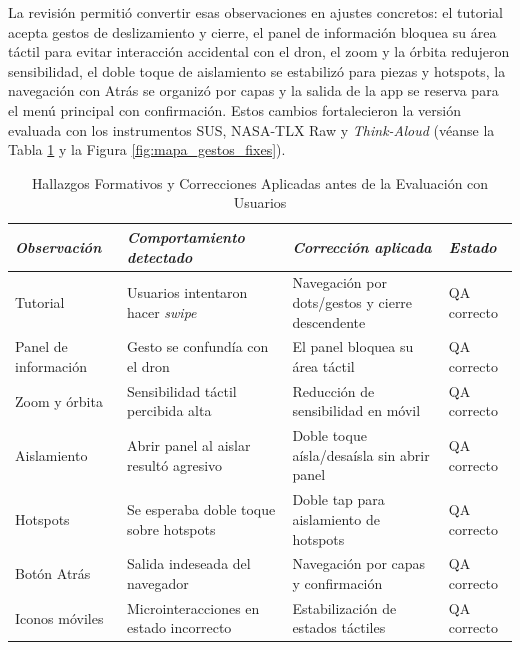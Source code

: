 La revisión permitió convertir esas observaciones en ajustes concretos: el tutorial acepta gestos de deslizamiento y cierre, el panel de información bloquea su área táctil para evitar interacción accidental con el dron, el zoom y la órbita redujeron sensibilidad, el doble toque de aislamiento se estabilizó para piezas y hotspots, la navegación con Atrás se organizó por capas y la salida de la app se reserva para el menú principal con confirmación. Estos cambios fortalecieron la versión evaluada con los instrumentos SUS, NASA-TLX Raw y \textit{Think-Aloud} (véanse la Tabla \ref{tab:hallazgos_formativos_fixes} y la Figura \ref{fig:mapa_gestos_fixes}).

\begin{table}[htbp]
    \caption[Hallazgos Formativos y Correcciones]{Hallazgos Formativos y Correcciones Aplicadas antes de la Evaluación con Usuarios}
    \label{tab:hallazgos_formativos_fixes}
    \begin{tabularx}{\textwidth}{p{2.8cm}p{3.8cm}Xp{1.8cm}}
        \hline
        \textit{Observación} & \textit{Comportamiento detectado} & \textit{Corrección aplicada} & \textit{Estado} \\ \hline
        Tutorial & Usuarios intentaron hacer \textit{swipe} & Navegación por dots/gestos y cierre descendente & QA correcto \\
        Panel de información & Gesto se confundía con el dron & El panel bloquea su área táctil & QA correcto \\
        Zoom y órbita & Sensibilidad táctil percibida alta & Reducción de sensibilidad en móvil & QA correcto \\
        Aislamiento & Abrir panel al aislar resultó agresivo & Doble toque aísla/desaísla sin abrir panel & QA correcto \\
        Hotspots & Se esperaba doble toque sobre hotspots & Doble tap para aislamiento de hotspots & QA correcto \\
        Botón Atrás & Salida indeseada del navegador & Navegación por capas y confirmación & QA correcto \\
        Iconos móviles & Microinteracciones en estado incorrecto & Estabilización de estados táctiles & QA correcto \\ \hline
    \end{tabularx}
\end{table}

